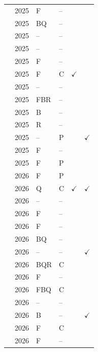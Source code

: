 \begin{longtable}{@{}llllcc@{}}
\cite{cm2025driven} & 2025 & F & -- &  &  \\
\cite{dawat2025development} & 2025 & BQ & -- &  &  \\
\cite{eweoya2025design} & 2025 & -- & -- &  &  \\
\cite{faizulanwarramdhani2025designing} & 2025 & -- & -- &  &  \\
\cite{faris2025simulating} & 2025 & F & -- &  &  \\
\cite{fernandez2025facial} & 2025 & F & C & $\checkmark$ &  \\
\cite{fitriyana2025sistem} & 2025 & -- & -- &  &  \\
\cite{maharajpet2025driven} & 2025 & FBR & -- &  &  \\
\cite{patil2025tick} & 2025 & B & -- &  &  \\
\cite{patrakar2025student} & 2025 & R & -- &  &  \\
\cite{premitasari2025dynamic} & 2025 & -- & P &  & $\checkmark$ \\
\cite{situmorang2025development} & 2025 & F & -- &  &  \\
\cite{varma2025integrating} & 2025 & F & P &  &  \\
\cite{akintunde2026smart} & 2026 & F & P &  &  \\
\cite{amoanu2026session} & 2026 & Q & C & $\checkmark$ & $\checkmark$ \\
\cite{chaitanyadigralehimalichaudharimayurpatil2026preventing} & 2026 & -- & -- &  &  \\
\cite{dongre2026university} & 2026 & F & -- &  &  \\
\cite{dsainathgoudksaimadhaveyakshinimpreethi2026guardianid} & 2026 & F & -- &  &  \\
\cite{edafeajiroke2026dwell} & 2026 & BQ & -- &  &  \\
\cite{firdausiyah2026based} & 2026 & -- & -- &  & $\checkmark$ \\
\cite{gaftandzhieva2026attendease} & 2026 & BQR & C &  &  \\
\cite{groja2026location} & 2026 & F & -- &  &  \\
\cite{gulo2026design} & 2026 & FBQ & C &  &  \\
\cite{hasanah2026design} & 2026 & -- & -- &  &  \\
\cite{korkortsi2026cross} & 2026 & B & -- &  & $\checkmark$ \\
\cite{kumar2026geosecure} & 2026 & F & C &  &  \\
\cite{mittalpatne2026research} & 2026 & F & -- &  &  \\

\end{longtable}
